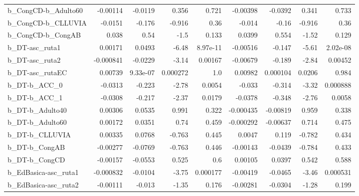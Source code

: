 \begin{tabular}{lrrrrrrrr}
b\_CongCD-b\_Adulto60        &    -0.00114 &      -0.0119 &     0.356 &    0.721 &   -0.00398 &     -0.0392 &        0.341 &         0.733 \\
b\_CongCD-b\_CLLUVIA         &     -0.0151 &       -0.176 &    -0.916 &     0.36 &     -0.014 &       -0.16 &       -0.916 &          0.36 \\
b\_CongCD-b\_CongAB          &       0.038 &         0.54 &      -1.5 &    0.133 &     0.0399 &       0.554 &        -1.52 &         0.129 \\
b\_DT-asc\_ruta1             &     0.00171 &       0.0493 &     -6.48 & 8.97e-11 &   -0.00516 &      -0.147 &        -5.61 &      2.02e-08 \\
b\_DT-asc\_ruta2             &   -0.000841 &      -0.0229 &     -3.14 &  0.00167 &   -0.00679 &      -0.189 &        -2.84 &       0.00452 \\
b\_DT-asc\_rutaEC            &     0.00739 &     9.33e-07 &  0.000272 &      1.0 &    0.00982 &    0.000104 &       0.0206 &         0.984 \\
b\_DT-b\_ACC\_0               &     -0.0313 &       -0.223 &     -2.78 &   0.0054 &     -0.033 &      -0.314 &        -3.32 &      0.000888 \\
b\_DT-b\_ACC\_1               &     -0.0308 &       -0.217 &     -2.37 &   0.0179 &    -0.0378 &      -0.348 &        -2.76 &        0.0058 \\
b\_DT-b\_Adulto40            &     0.00306 &       0.0535 &     0.991 &    0.322 &  -0.000435 &    -0.00819 &        0.959 &         0.338 \\
b\_DT-b\_Adulto60            &     0.00172 &       0.0351 &      0.74 &    0.459 &  -0.000292 &    -0.00637 &        0.714 &         0.475 \\
b\_DT-b\_CLLUVIA             &     0.00335 &       0.0768 &    -0.763 &    0.445 &     0.0047 &       0.119 &       -0.782 &         0.434 \\
b\_DT-b\_CongAB              &    -0.00277 &      -0.0769 &    -0.763 &    0.446 &   -0.00143 &     -0.0439 &       -0.784 &         0.433 \\
b\_DT-b\_CongCD              &    -0.00157 &      -0.0553 &     0.525 &      0.6 &    0.00105 &      0.0397 &        0.542 &         0.588 \\
b\_EdBasica-asc\_ruta1       &   -0.000832 &      -0.0104 &     -3.75 & 0.000177 &   -0.00419 &     -0.0465 &        -3.46 &      0.000531 \\
b\_EdBasica-asc\_ruta2       &    -0.00111 &       -0.013 &     -1.35 &    0.176 &   -0.00281 &     -0.0304 &        -1.28 &         0.199 \\

\end{tabular}
